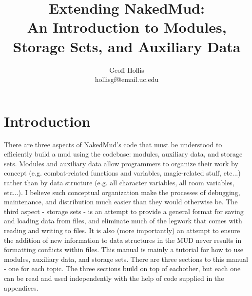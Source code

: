 \documentclass[12pt]{article}
\title{Extending NakedMud:\\
       An Introduction to Modules, Storage Sets, and Auxiliary Data}
\author{Geoff Hollis\\
	    hollisgf@email.uc.edu}
\begin{document}



\maketitle
\newpage
\tableofcontents
\newpage



\section{Introduction}
There are three aspects of NakedMud's code that must be understood to efficiently build a mud using the codebase: modules, auxiliary data, and storage sets. Modules and auxiliary data allow programmers to organize their work by concept (e.g. combat-related functions and variables, magic-related stuff, etc...) rather than by data structure (e.g. all character variables, all room variables, etc...). I believe such conceptual organization make the processes of debugging, maintenance, and distribution much easier than they would otherwise be. The third aspect - storage sets - is an attempt to provide a general format for saving and loading data from files, and eliminate much of the legwork that comes with reading and writing to files. It is also (more importantly) an attempt to ensure the addition of new information to data structures in the MUD never results in formatting conflicts within files. This manual is mainly a tutorial for how to use modules, auxiliary data, and storage sets. There are three sections to this manual - one for each topic. The three sections build on top of eachother, but each one can be read and used independently with the help of code supplied in the appendices.
\end{document}
